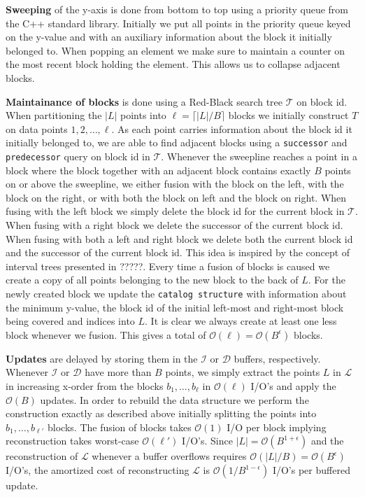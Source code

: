 \documentclass[twoside,11pt,openright]{report}
\begin{document}
\textbf{Sweeping} of the y-axis is done from bottom to top using a priority queue from the C++ standard library. Initially we put all points in the priority queue keyed on the y-value and with an auxiliary information about the block it initially belonged to. When popping an element we make sure to maintain a counter on the most recent block holding the element. This allows us to collapse adjacent blocks.

\textbf{Maintainance of blocks} is done using a Red-Black search tree $\mathcal{T}$ on block id. When partitioning the $\vert L \vert$ points into $\ell = \lceil\lvert L \lvert / B\rceil$ blocks we initially construct $T$ on data points $1, 2, \dots, \ell$. As each point carries information about the block id it initially belonged to, we are able to find adjacent blocks using a \texttt{successor} and \texttt{predecessor} query on block id in $\mathcal{T}$. Whenever the sweepline reaches a point in a block where the block together with an adjacent block contains exactly $B$ points on or above the sweepline, we either fusion with the block on the left, with the block on the right, or with both the block on left and the block on right. When fusing with the left block we simply delete the block id for the current block in $\mathcal{T}$. When fusing with a right block we delete the successor of the current block id. When fusing with both a left and right block we delete both the current block id and the successor of the current block id. This idea is inspired by the concept of interval trees presented in ?????. %
Every time a fusion of blocks is caused we create a copy of all points belonging to the new block to the back of $L$. For the newly created block we update the \texttt{catalog structure} with information about the minimum y-value, the block id of the initial left-most and right-most block being covered and indices into $L$.
It is clear we always create at least one less block whenever we fusion. This gives a total of $\mathcal{O}(\ell) = \mathcal{O}(B^{\epsilon})$ blocks.

\textbf{Updates} are delayed by storing them in the $\mathcal{I}$ or $\mathcal{D}$ buffers, respectively. Whenever $\mathcal{I}$ or $\mathcal{D}$ have more than $B$ points, we simply extract the points $L$ in $\mathcal{L}$ in increasing x-order from the blocks $b_1, \dots, b_{\ell}$ in $\mathcal{O}(\ell)$ I/O's and apply the $\mathcal{O}(B)$ updates. In order to rebuild the data structure we perform the construction exactly as described above initially splitting the points into $b_1, \dots, b_{\ell'}$ blocks. The fusion of blocks takes $\mathcal{O}(1)$ I/O per block implying reconstruction takes worst-case $\mathcal{O}(\ell')$ I/O's. Since $\lvert L \lvert = \mathcal{O}(B^{1+\epsilon})$ and the reconstruction of $\mathcal{L}$ whenever a buffer overflows requires $\mathcal{O}(\lvert L \lvert / B) = \mathcal{O}(B^{\epsilon})$ I/O's, the amortized cost of reconstructing $\mathcal{L}$ is $\mathcal{O}(1/B^{1-\epsilon})$ I/O's per buffered update.
\end{document}
